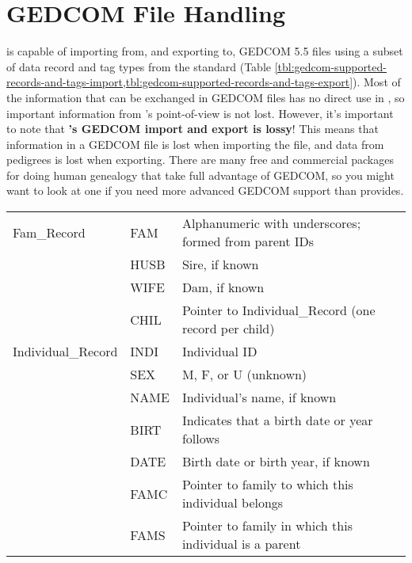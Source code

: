 \chapter{GEDCOM File Handling}\label{GEDCOM}
\PyPedal{} is capable of importing from, and exporting to, GEDCOM 5.5 files using a subset
of data record and tag types from the standard (Table 
\ref{tbl:gedcom-supported-records-and-tags-import,tbl:gedcom-supported-records-and-tags-export}).
Most of the information that can be
 exchanged in GEDCOM files has no direct use in \PyPedal{}, so important information from \PyPedal{}'s point-of-view is not lost. However, it's important to note that \textbf{\PyPedal{}'s GEDCOM import and export is lossy}! This means that information in a GEDCOM file is lost when importing the file, and data from \PyPedal{} pedigrees is lost when exporting. There are many free and commercial packages for doing human genealogy that take full advantage of GEDCOM, so you might want to look at one if you need more advanced GEDCOM support than \PyPedal{} provides.
\begin{center}
    \tablelasttail{\hline}
    \label{tbl:gedcom-supported-records-and-tags-import}
    \begin{xtabular}{l|p{1in}|p{3in}}
    Fam_Record & {FAM} & Alphanumeric with underscores; formed from parent IDs \\
     & {HUSB} & Sire, if known \\
     & {WIFE} & Dam, if known \\
     & {CHIL} & Pointer to Individual_Record (one record per child) \\
    Individual_Record & {INDI} & Individual ID \\
     & SEX & M, F, or U (unknown) \\
     & NAME & Individual's name, if known \\
     & BIRT & Indicates that a birth date or year follows \\
     & DATE & Birth date or birth year, if known \\
     & FAMC & Pointer to family to which this individual belongs \\
     & FAMS & Pointer to family in which this individual is a parent \\
    \end{xtabular}
\end{center}
